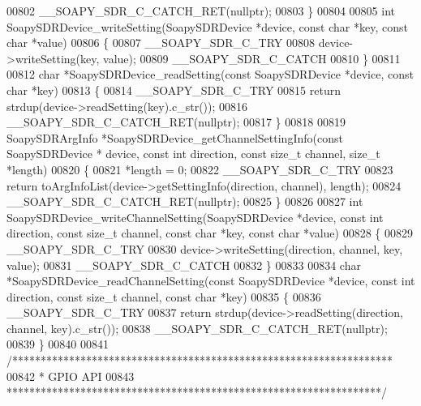 \begin{DoxyCode}
00802     __SOAPY_SDR_C_CATCH_RET(\textcolor{keyword}{nullptr});
00803 \}
00804 
00805 \textcolor{keywordtype}{int} SoapySDRDevice_writeSetting(SoapySDRDevice *device, \textcolor{keyword}{const} \textcolor{keywordtype}{char} *key, \textcolor{keyword}{const} \textcolor{keywordtype}{char} *value)
00806 \{
00807     __SOAPY_SDR_C_TRY
00808     device->writeSetting(key, value);
00809     __SOAPY_SDR_C_CATCH
00810 \}
00811 
00812 \textcolor{keywordtype}{char} *SoapySDRDevice_readSetting(\textcolor{keyword}{const} SoapySDRDevice *device, \textcolor{keyword}{const} \textcolor{keywordtype}{char} *key)
00813 \{
00814     __SOAPY_SDR_C_TRY
00815     \textcolor{keywordflow}{return} strdup(device->readSetting(key).c\_str());
00816     __SOAPY_SDR_C_CATCH_RET(\textcolor{keyword}{nullptr});
00817 \}
00818 
00819 SoapySDRArgInfo *SoapySDRDevice_getChannelSettingInfo(\textcolor{keyword}{const} SoapySDRDevice *
      device, \textcolor{keyword}{const} \textcolor{keywordtype}{int} direction, \textcolor{keyword}{const} \textcolor{keywordtype}{size\_t} channel, \textcolor{keywordtype}{size\_t} *length)
00820 \{
00821     *length = 0;
00822     __SOAPY_SDR_C_TRY
00823     \textcolor{keywordflow}{return} toArgInfoList(device->getSettingInfo(direction, channel), length);
00824     __SOAPY_SDR_C_CATCH_RET(\textcolor{keyword}{nullptr});
00825 \}
00826 
00827 \textcolor{keywordtype}{int} SoapySDRDevice_writeChannelSetting(SoapySDRDevice *device, \textcolor{keyword}{const} \textcolor{keywordtype}{int} direction, \textcolor{keyword}{const} \textcolor{keywordtype}{size\_t} channel, \textcolor{keyword}{
      const} \textcolor{keywordtype}{char} *key, \textcolor{keyword}{const} \textcolor{keywordtype}{char} *value)
00828 \{
00829     __SOAPY_SDR_C_TRY
00830     device->writeSetting(direction, channel, key, value);
00831     __SOAPY_SDR_C_CATCH
00832 \}
00833 
00834 \textcolor{keywordtype}{char} *SoapySDRDevice_readChannelSetting(\textcolor{keyword}{const} SoapySDRDevice *device, \textcolor{keyword}{const} \textcolor{keywordtype}{int} direction, \textcolor{keyword}{const} \textcolor{keywordtype}{size\_t} 
      channel, \textcolor{keyword}{const} \textcolor{keywordtype}{char} *key)
00835 \{
00836     __SOAPY_SDR_C_TRY
00837     \textcolor{keywordflow}{return} strdup(device->readSetting(direction, channel, key).c\_str());
00838     __SOAPY_SDR_C_CATCH_RET(\textcolor{keyword}{nullptr});
00839 \}
00840 
00841 \textcolor{comment}{/*******************************************************************}
00842 \textcolor{comment}{ * GPIO API}
00843 \textcolor{comment}{ ******************************************************************/}

\end{DoxyCode}
